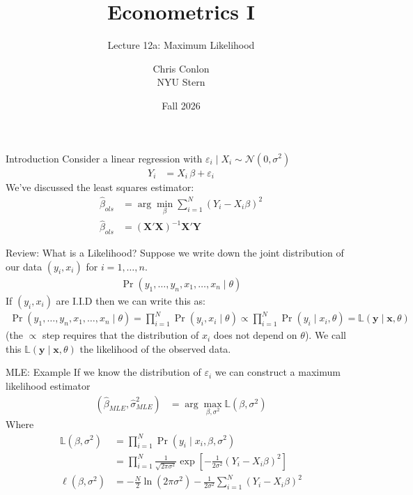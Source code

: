 \documentclass[aspectratio=169,11pt]{beamer}
\title[L12a - Maximum Likelihood]{ Econometrics I}
\subtitle{Lecture 12a: Maximum Likelihood}
\author{Chris Conlon \\NYU Stern}
\date{Fall 2026}
\begin{document}
\maketitle

\begin{frame}{Introduction}
Consider a linear regression with $\varepsilon_i \mid X_i \sim \mathcal{N}(0,\sigma^2)$
\begin{align*}
Y_{i} &= X_{i}\, \beta + \varepsilon_{i}
\end{align*}
We've discussed the \alert{least squares estimator}:
\begin{align*}
\widehat{\beta}_{ols} &= \arg \min_{\beta} \sum_{i=1}^N (Y_i - X_i \beta)^2\\
\widehat{\beta}_{ols} &= (\mathbf{X}'\mathbf{X})^{-1} \mathbf{X}' \mathbf{Y}
\end{align*}
\end{frame}


\begin{frame}{Review: What is a Likelihood?}
Suppose we write down the joint distribution of our data $(y_i,x_i)$ for $i=1,\ldots,n$.
\begin{align*}
\Pr(y_1,\ldots,y_n, x_1,\ldots,x_n \mid  \theta)
\end{align*}
If  $(y_i,x_i)$ are I.I.D then we can write this as:
\begin{align*}
 \Pr(y_1,\ldots,y_n, x_1,\ldots,x_n \mid \theta) = \prod_{i=1}^N \Pr(y_i, x_i \mid \theta) \propto \prod_{i=1}^N \Pr(y_i \mid x_i , \theta)=\mathbb{L}( \mathbf{y} \mid \mathbf{x} ,\theta )
\end{align*}
(the $\propto$ step requires that the distribution of $x_i$ does not depend on $\theta$).
We call this $\mathbb{L}( \mathbf{y}\mid \mathbf{x} ,\theta )$ the \alert{likelihood} of the observed data.
\end{frame}




\begin{frame}{MLE: Example}
If we know the distribution of $\varepsilon_i$ we can construct a \alert{maximum likelihood estimator}
\begin{align*}
(\widehat{\beta}_{MLE},\widehat{\sigma}^2_{MLE}) &= \arg \max_{\beta,\sigma^2} \mathbb{L}(\beta,\sigma^2)
\end{align*}
Where 
\begin{align*} 
\mathbb{L}(\beta,\sigma^2) &= \prod_{i=1}^N \Pr(y_i \mid x_i,\beta,\sigma^2) \\
                  &= \prod_{i=1}^N \frac{1}{\sqrt{2 \pi \sigma^2}} \exp \left[-\frac{1}{2\sigma^2}(Y_i - X_i \beta)^2 \right]\\
\ell(\beta,\sigma^2) &= -\frac{N}{2} \ln (2 \pi \sigma^2) - \frac{1}{2 \sigma^2} \sum_{i=1}^N(Y_i - X_i \beta)^2
\end{align*}
\end{frame}
\end{document}
